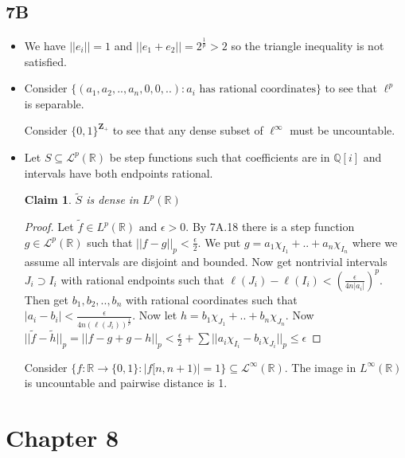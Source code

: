 \documentclass{article}
\newtheorem*{claim}{Claim}
\begin{document}
\subsection*{7B}
\begin{itemize}
    \item [1] We have $||e_i||=1$ and $||e_1+e_2||=2^\frac{1}{p}>2$ so the triangle inequality is not satisfied.
    \item[2] Consider $\{(a_1,a_2,..,a_n,0,0,..):a_i \text{ has rational coordinates}\}$ to see that $\ell^p$ is separable.

    Consider $\{0,1\}^{\mathbf{Z}_+}$ to see that any dense subset of $\ell^\infty$ must be uncountable.

    \item[3] Let $S \subseteq \mathcal{L}^p(\mathbb{R})$ be step functions such that coefficients are in $\mathbb{Q}[i]$ and intervals have both endpoints rational.

    \begin{claim}
        $\tilde{S}$ is dense in $L^p(\mathbb{R})$
    \end{claim}

    \begin{proof}
        Let $\tilde{f} \in L^p(\mathbb{R}) \text{ and } \epsilon > 0$. By 7A.18 there is a step function $g \in \mathcal{L}^p(\mathbb{R})$ such that $||f-g||_p<\frac{\epsilon}{2}$. We put $g=a_1\chi_{I_1}+..+a_n\chi_{I_n}$ where we assume all intervals are disjoint and bounded. Now get nontrivial intervals $J_i\supset I_i$ with rational endpoints such that $\ell(J_i)-\ell(I_i)<(\frac{\epsilon}{4n|a_i|})^p$. Then get $b_1,b_2,..,b_n$ with rational coordinates  such that $|a_i-b_i|<\frac{\epsilon}{4n(\ell(J_i))^\frac{1}{p}}$. Now let $h=b_1\chi_{J_1}+..+b_n\chi_{J_n}$. Now $||\tilde{f}-\tilde{h}||_p=||f-g+g-h||_p < \frac{\epsilon}{2}+\sum||a_i\chi_{I_i}-b_i\chi_{J_i}||_p \leq \epsilon$
    \end{proof}

    Consider $\{f:\mathbb{R}\to\{0,1\}:|f[n,n+1)|=1\}\subseteq \mathcal{L}^\infty(\mathbb{R})$. The image in $L^\infty(\mathbb{R})$ is uncountable and pairwise distance is 1.


\end{itemize}

\section*{Chapter 8}
\end{document}
